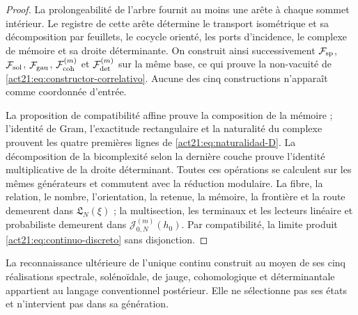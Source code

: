 \begin{proof}
La prolongeabilité de l'arbre fournit au moins une arête à chaque sommet intérieur. Le registre de cette arête détermine le transport isométrique et sa décomposition par feuillets, le cocycle orienté, les ports d'incidence, le complexe de mémoire et sa droite déterminante. On construit ainsi successivement \(\mathcal F_{\rm sp}\), \(\mathcal F_{\rm sol}\), \(\mathcal F_{\rm gau}\), \(\mathcal F_{\rm coh}^{(m)}\) et \(\mathcal F_{\rm det}^{(m)}\) sur la même base, ce qui prouve la non-vacuité de \eqref{act21:eq:constructor-correlativo}. Aucune des cinq constructions n'apparaît comme coordonnée d'entrée.

La proposition de compatibilité affine prouve la composition de la mémoire ;
l'identité de Gram, l'exactitude rectangulaire et la naturalité du complexe
prouvent les quatre premières lignes de \eqref{act21:eq:naturalidad-D}. La
décomposition de la bicomplexité selon la dernière couche prouve l'identité
multiplicative de la droite déterminant. Toutes ces opérations se calculent
sur les mêmes générateurs et commutent avec la réduction modulaire. La fibre,
la relation, le nombre, l'orientation, la retenue, la mémoire, la frontière et
la route demeurent dans \(\mathfrak L_N(\xi)\) ; la multisection, les terminaux
et les lecteurs linéaire et probabiliste demeurent dans
\(\mathcal J_{0,N}^{(m)}(h_0)\). Par compatibilité, la limite produit
\eqref{act21:eq:continuo-discreto} sans disjonction.
\end{proof}

La reconnaissance ultérieure de l'unique continu construit au moyen de ses cinq
réalisations spectrale, solénoïdale, de jauge, cohomologique et déterminantale
appartient au langage conventionnel postérieur. Elle ne sélectionne pas ses états et
n'intervient pas dans sa génération.
\fi


